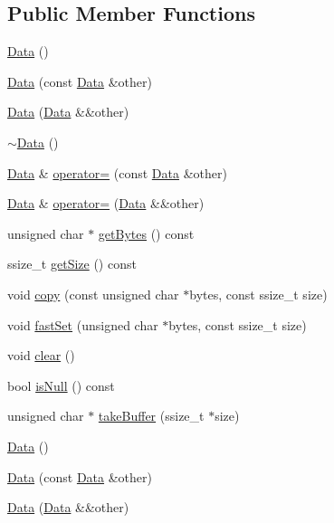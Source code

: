 \subsection*{Public Member Functions}
\begin{DoxyCompactItemize}
\item 
\hyperlink{classData_af11f741cb7f587e2e495452a8905a22a}{Data} ()
\item 
\hyperlink{classData_a0a6006d6052c8224749bbce584f403ea}{Data} (const \hyperlink{classData}{Data} \&other)
\item 
\hyperlink{classData_a7dcf68b2d1621201be76fe551dc171a3}{Data} (\hyperlink{classData}{Data} \&\&other)
\item 
\hyperlink{classData_aab31956423290f0d62dcca47ab4d16dd}{$\sim$\+Data} ()
\item 
\hyperlink{classData}{Data} \& \hyperlink{classData_ac5e314c7b80a4a7fcecb4c7cb0b40783}{operator=} (const \hyperlink{classData}{Data} \&other)
\item 
\hyperlink{classData}{Data} \& \hyperlink{classData_a06a02edb0612660b8339f15d7e99d4d0}{operator=} (\hyperlink{classData}{Data} \&\&other)
\item 
unsigned char $\ast$ \hyperlink{classData_a677f15e70114b7af021355b3b2618770}{get\+Bytes} () const
\item 
ssize\+\_\+t \hyperlink{classData_adb810cfcdcb6c3da22ac05a4c023445d}{get\+Size} () const
\item 
void \hyperlink{classData_a11d09c86fa7696d0cd89c0fe08970bf8}{copy} (const unsigned char $\ast$bytes, const ssize\+\_\+t size)
\item 
void \hyperlink{classData_ad679f9c8cdff29d6a18c56fa9b70064a}{fast\+Set} (unsigned char $\ast$bytes, const ssize\+\_\+t size)
\item 
void \hyperlink{classData_a44b749f64ffa35e034f9503fdec4917e}{clear} ()
\item 
bool \hyperlink{classData_af0c867ee0a1b0916ce50e9966cd252ef}{is\+Null} () const
\item 
unsigned char $\ast$ \hyperlink{classData_a01e95fc47766e7d4cbfea893e02d0479}{take\+Buffer} (ssize\+\_\+t $\ast$size)
\item 
\hyperlink{classData_af11f741cb7f587e2e495452a8905a22a}{Data} ()
\item 
\hyperlink{classData_a0a6006d6052c8224749bbce584f403ea}{Data} (const \hyperlink{classData}{Data} \&other)
\item 
\hyperlink{classData_a7dcf68b2d1621201be76fe551dc171a3}{Data} (\hyperlink{classData}{Data} \&\&other)

\end{DoxyCompactItemize}
